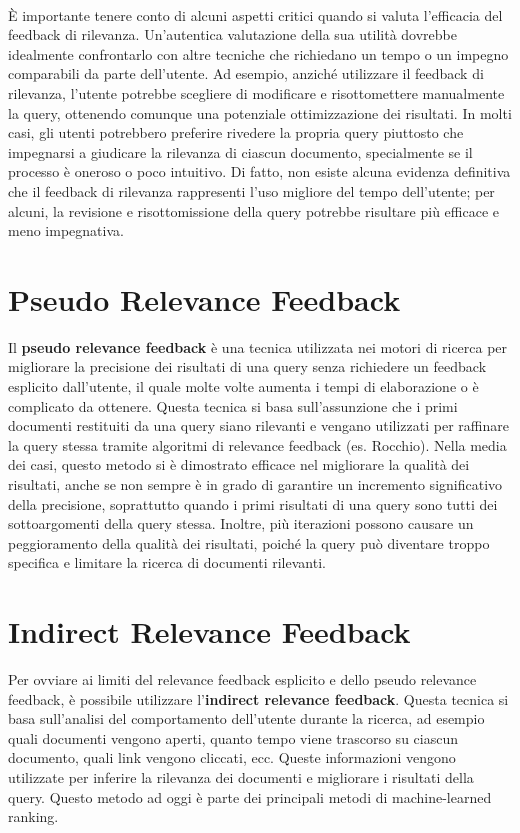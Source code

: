 \documentclass{report}
\begin{document}
	\vspace{\baselineskip}\\
	È importante tenere conto di alcuni aspetti critici quando si valuta l’efficacia del feedback di rilevanza. Un'autentica valutazione della sua utilità dovrebbe idealmente confrontarlo con altre tecniche che richiedano un tempo o un impegno comparabili da parte dell’utente. Ad esempio, anziché utilizzare il feedback di rilevanza, l’utente potrebbe scegliere di modificare e risottomettere manualmente la query, ottenendo comunque una potenziale ottimizzazione dei risultati. In molti casi, gli utenti potrebbero preferire rivedere la propria query piuttosto che impegnarsi a giudicare la rilevanza di ciascun documento, specialmente se il processo è oneroso o poco intuitivo. Di fatto, non esiste alcuna evidenza definitiva che il feedback di rilevanza rappresenti l’uso migliore del tempo dell'utente; per alcuni, la revisione e risottomissione della query potrebbe risultare più efficace e meno impegnativa.

	\section{Pseudo Relevance Feedback}
	Il \textbf{pseudo relevance feedback} è una tecnica utilizzata nei motori di ricerca per migliorare la precisione dei risultati di una query senza richiedere un feedback esplicito dall'utente, il  quale molte volte aumenta i tempi di elaborazione o è complicato da ottenere. Questa tecnica si basa sull'assunzione che i primi documenti restituiti da una query siano rilevanti e vengano utilizzati per raffinare la query stessa tramite algoritmi di relevance feedback (es. Rocchio). Nella media dei casi, questo metodo si è dimostrato efficace nel migliorare la qualità dei risultati, anche se non sempre è in grado di garantire un incremento significativo della precisione, soprattutto quando i primi risultati di una query sono tutti dei sottoargomenti della query stessa. Inoltre, più iterazioni possono causare un peggioramento della qualità dei risultati, poiché la query può diventare troppo specifica e limitare la ricerca di documenti rilevanti. 

	\section{Indirect Relevance Feedback}
	Per ovviare ai limiti del relevance feedback esplicito e dello pseudo relevance feedback, è possibile utilizzare l'\textbf{indirect relevance feedback}. Questa tecnica si basa sull'analisi del comportamento dell'utente durante la ricerca, ad esempio quali documenti vengono aperti, quanto tempo viene trascorso su ciascun documento, quali link vengono cliccati, ecc. Queste informazioni vengono utilizzate per inferire la rilevanza dei documenti e migliorare i risultati della query. Questo metodo ad oggi è parte dei principali metodi di machine-learned ranking.
\end{document}
